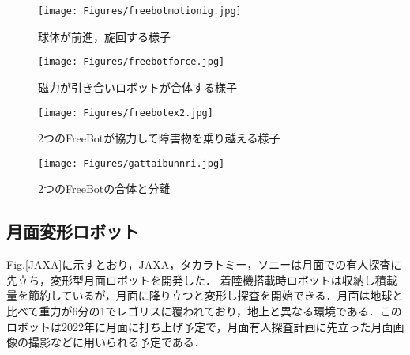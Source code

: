 \documentclass[a4paper,11pt,dvipdfmx.uplatex]{jsarticle}
\begin{document}
\begin{table}[htbp]
\centering
\caption{FreeBotの仕様\cite{FreeBot}}
\end{table}

\begin{figure}[htbp]
\centering
  \texttt{[image: Figures/freebotmotionig.jpg]}
  \caption{球体が前進，旋回する様子\cite{FreeBot}}
  \label{前進後退}
\end{figure}

\begin{figure}[htbp]
\centering
  \texttt{[image: Figures/freebotforce.jpg]}
  \caption{磁力が引き合いロボットが合体する様子\cite{FreeBot}}
  \label{合体}
\end{figure}

\begin{figure}[htbp]
\centering
  \texttt{[image: Figures/freebotex2.jpg]}
  \caption{2つのFreeBotが協力して障害物を乗り越える様子\cite{FreeBot}}
  \label{乗り越え}
\end{figure}


\begin{figure*}[htbp]
\centering
  \texttt{[image: Figures/gattaibunnri.jpg]} 
  \caption{2つのFreeBotの合体と分離\cite{FreeBot}}
  \label{合体分離}
\end{figure*}


\subsection{月面変形ロボット}
Fig.\ref{JAXA}に示すとおり，JAXA，タカラトミー，ソニーは月面での有人探査に先立ち，変形型月面ロボットを開発した．
着陸機搭載時ロボットは収納し積載量を節約しているが，月面に降り立つと変形し探査を開始できる．月面は地球と比べて重力が6分の1でレゴリスに覆われており，地上と異なる環境である\cite{JAXA}．このロボットは2022年に月面に打ち上げ予定で，月面有人探査計画に先立った月面画像の撮影などに用いられる予定である．
\end{document}
